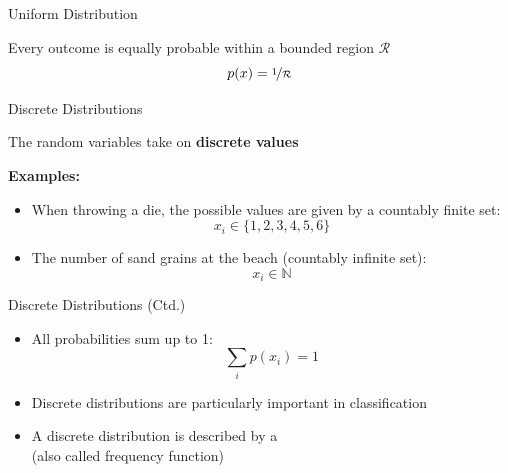 \begin{frame}{Uniform Distribution}{}
	
	
	\begin{center}
		Every outcome is equally probable within a bounded region $\mathcal{R}$
		\begin{equation}
			p(x) = \nicefrac{1}{\mathcal{R}}
		\end{equation}
	\end{center}
\end{frame}


\begin{frame}{Discrete Distributions}{}
	\begin{boxBlueNoFrame}
		The random variables take on \textbf{discrete values}
	\end{boxBlueNoFrame}

	\textbf{Examples:}
	\begin{itemize}
		\item When throwing a die, the possible values are given by a countably finite set:
		\begin{equation*}
			x_i \in \{ 1, 2, 3, 4, 5, 6 \}
		\end{equation*}
		\item The number of sand grains at the beach (countably infinite set):
		\begin{equation*}
			x_i \in \mathbb{N}
		\end{equation*}
	\end{itemize}
\end{frame}


\begin{frame}{Discrete Distributions (Ctd.)}{}
	\begin{itemize}
		\item All probabilities sum up to 1:
		\begin{equation*}
			\sum_i p(x_i) = 1
		\end{equation*}
		\item Discrete distributions are particularly important in classification
		\item A discrete distribution is described by a  \\
			(also called frequency function)
	\end{itemize}
\end{frame}


